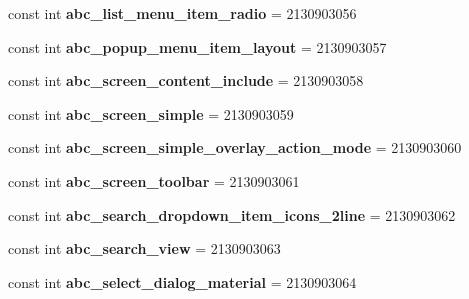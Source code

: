 \begin{DoxyCompactItemize}
\item 
\mbox{\label{classXaria_1_1Resource_1_1Layout_a2b2ef54d922fb85a91303b2bfdb1dc9c}} 
const int {\bfseries abc\+\_\+list\+\_\+menu\+\_\+item\+\_\+radio} = 2130903056
\item 
\mbox{\label{classXaria_1_1Resource_1_1Layout_acfae198058cb602d6374ec748a11ac20}} 
const int {\bfseries abc\+\_\+popup\+\_\+menu\+\_\+item\+\_\+layout} = 2130903057
\item 
\mbox{\label{classXaria_1_1Resource_1_1Layout_a78302157ed3b14531ba03f039464af7c}} 
const int {\bfseries abc\+\_\+screen\+\_\+content\+\_\+include} = 2130903058
\item 
\mbox{\label{classXaria_1_1Resource_1_1Layout_a53d06dd8779076297774374ea2f07993}} 
const int {\bfseries abc\+\_\+screen\+\_\+simple} = 2130903059
\item 
\mbox{\label{classXaria_1_1Resource_1_1Layout_a30dec68a33333763a45df3979f7383f8}} 
const int {\bfseries abc\+\_\+screen\+\_\+simple\+\_\+overlay\+\_\+action\+\_\+mode} = 2130903060
\item 
\mbox{\label{classXaria_1_1Resource_1_1Layout_a86806fc3dca62034926d3e83efce0a1a}} 
const int {\bfseries abc\+\_\+screen\+\_\+toolbar} = 2130903061
\item 
\mbox{\label{classXaria_1_1Resource_1_1Layout_a3b43060df8aead9a1b2eb7e62473fa10}} 
const int {\bfseries abc\+\_\+search\+\_\+dropdown\+\_\+item\+\_\+icons\+\_\+2line} = 2130903062
\item 
\mbox{\label{classXaria_1_1Resource_1_1Layout_a1cc79608cda9c7075459b8c636cdd9ed}} 
const int {\bfseries abc\+\_\+search\+\_\+view} = 2130903063
\item 
\mbox{\label{classXaria_1_1Resource_1_1Layout_a3e4460a26eba0c6f6815a4afa19c55ee}} 
const int {\bfseries abc\+\_\+select\+\_\+dialog\+\_\+material} = 2130903064
\item 

\end{DoxyCompactItemize}

